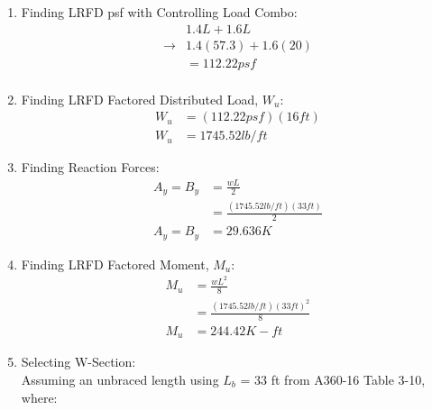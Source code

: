\documentclass{report} %
\begin{document}
\begin{enumerate}
    \item Finding LRFD psf with Controlling Load Combo:
        \begin{equation*}
            \begin{aligned}
                &1.4L + 1.6L \\ 
                \rightarrow &1.4(57.3) + 1.6(20) \\
                &=112.22psf\\   
            \end{aligned}
        \end{equation*}
    \item Finding LRFD Factored Distributed Load, $W_u$:
        \begin{equation*}
            \begin{aligned}
                W_u &= (112.22psf)(16ft) \\
                W_u &= 1745.52 lb/ft
            \end{aligned}
        \end{equation*}
    \item Finding Reaction Forces:
        \begin{equation*}
            \begin{aligned}
                A_y = B_y &= \frac{wL}{2} \\
                        &= \frac{(1745.52 lb/ft)(33 ft)}{2} \\
                A_y = B_y &= 29.636K
            \end{aligned}
        \end{equation*}
    \item Finding LRFD Factored Moment, $M_u$:
        \begin{equation*}
            \begin{aligned}
                M_u &= \frac{wL^2}{8} \\
                    &= \frac{(1745.52 lb/ft)(33 ft)^2}{8} \\
                M_u &= 244.42 K-ft
            \end{aligned}
        \end{equation*}
    \item Selecting W-Section:\\
        Assuming an unbraced length using $L_b$ = 33 ft from A360-16 Table 3-10, where:
            \begin{equation*}
                \begin{aligned}

\end{aligned}
\end{equation*}
\end{enumerate}
\end{document}
